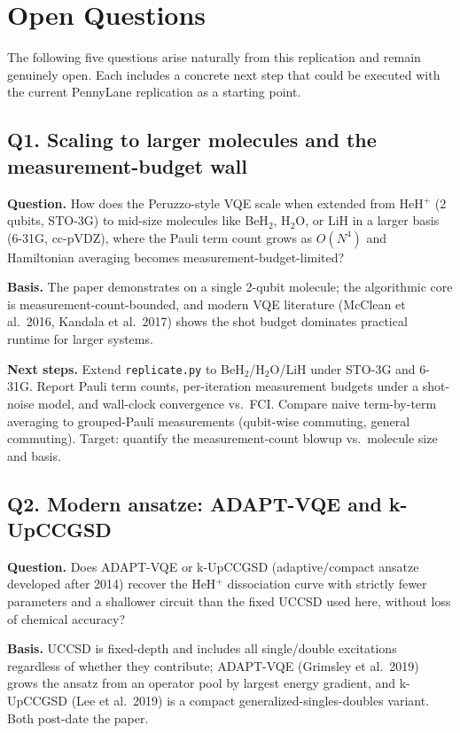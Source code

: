 \section{Open Questions}

The following five questions arise naturally from this replication and remain genuinely open. Each includes a concrete next step that could be executed with the current PennyLane replication as a starting point.

\subsection*{Q1. Scaling to larger molecules and the measurement-budget wall}
\textbf{Question.} How does the Peruzzo-style VQE scale when extended from HeH$^+$ (2 qubits, STO-3G) to mid-size molecules like BeH$_2$, H$_2$O, or LiH in a larger basis (6-31G, cc-pVDZ), where the Pauli term count grows as $O(N^4)$ and Hamiltonian averaging becomes measurement-budget-limited?

\textbf{Basis.} The paper demonstrates on a single 2-qubit molecule; the algorithmic core is measurement-count-bounded, and modern VQE literature (McClean et al.\ 2016, Kandala et al.\ 2017) shows the shot budget dominates practical runtime for larger systems.

\textbf{Next steps.} Extend \verb|replicate.py| to BeH$_2$/H$_2$O/LiH under STO-3G and 6-31G. Report Pauli term counts, per-iteration measurement budgets under a shot-noise model, and wall-clock convergence vs.\ FCI. Compare naive term-by-term averaging to grouped-Pauli measurements (qubit-wise commuting, general commuting). Target: quantify the measurement-count blowup vs.\ molecule size and basis.

\subsection*{Q2. Modern ansatze: ADAPT-VQE and k-UpCCGSD}
\textbf{Question.} Does ADAPT-VQE or k-UpCCGSD (adaptive/compact ansatze developed after 2014) recover the HeH$^+$ dissociation curve with strictly fewer parameters and a shallower circuit than the fixed UCCSD used here, without loss of chemical accuracy?

\textbf{Basis.} UCCSD is fixed-depth and includes all single/double excitations regardless of whether they contribute; ADAPT-VQE (Grimsley et al.\ 2019) grows the ansatz from an operator pool by largest energy gradient, and k-UpCCGSD (Lee et al.\ 2019) is a compact generalized-singles-doubles variant. Both post-date the paper.

